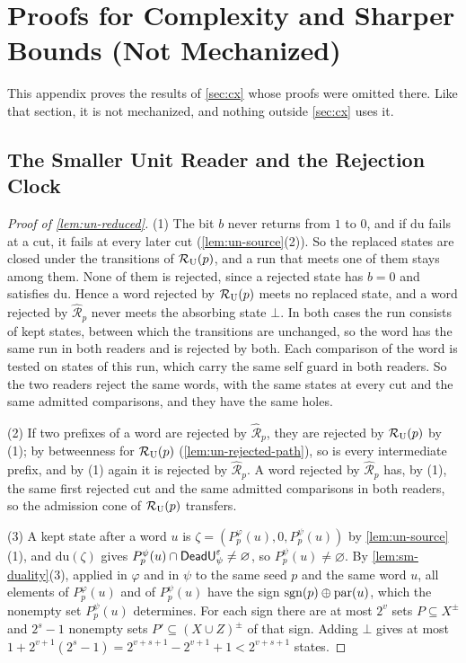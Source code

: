 
\section{Proofs for Complexity and Sharper Bounds (Not Mechanized)}\label{app:cx}

This appendix proves the results of \cref{sec:cx} whose proofs were omitted
there. Like that section, it is not mechanized, and nothing outside
\cref{sec:cx} uses it.

\subsection{The Smaller Unit Reader and the Rejection Clock}\label{app:cx-smaller}

\begin{proof}[Proof of \cref{lem:un-reduced}]
(1) The bit $b$ never returns from $1$ to $0$, and if $\mathrm{du}$ fails at a
cut, it fails at every later cut (\cref{lem:un-source}(2)). So the replaced
states are closed under the transitions of $\mathcal R_{\mathrm U}(p)$, and a run that meets one
of them stays among them. None of them is rejected, since a rejected state has
$b=0$ and satisfies $\mathrm{du}$. Hence a word rejected by $\mathcal R_{\mathrm U}(p)$ meets no
replaced state, and a word rejected by $\widehat{\mathcal R}_p$ never meets the
absorbing state $\bot$. In both cases the run consists of kept states, between
which the transitions are unchanged, so the word has the same run in both
readers and is rejected by both. Each comparison of the word is tested on
states of this run, which carry the same self guard in both readers. So the two
readers reject the same words, with the same states at every cut and the same
admitted comparisons, and they have the same holes.

(2) If two prefixes of a word are rejected by $\widehat{\mathcal R}_p$, they
are rejected by $\mathcal R_{\mathrm U}(p)$ by (1); by betweenness for $\mathcal R_{\mathrm U}(p)$
(\cref{lem:un-rejected-path}), so is every intermediate prefix, and by (1)
again it is rejected by $\widehat{\mathcal R}_p$. A word rejected by
$\widehat{\mathcal R}_p$ has, by (1), the same first rejected cut and the same
admitted comparisons in both readers, so the admission cone of $\mathcal R_{\mathrm U}(p)$
transfers.

(3) A kept state after a word $u$ is
$\zeta=(P^\varphi_p(u),0,P^\psi_p(u))$ by \cref{lem:un-source}(1), and
$\mathrm{du}(\zeta)$ gives $P^\psi_p(u)\cap\mathsf{DeadU}^\varepsilon_\psi\ne\varnothing$, so
$P^\psi_p(u)\ne\varnothing$. By \cref{lem:sm-duality}(3), applied in $\varphi$
and in $\psi$ to the same seed $p$ and the same word $u$, all elements of
$P^\varphi_p(u)$ and of $P^\psi_p(u)$ have the sign $\operatorname{sgn}(p)\oplus\operatorname{par}(u)$,
which the nonempty set $P^\psi_p(u)$ determines. For each sign there are at
most $2^v$ sets $P\subseteq X^\pm$ and $2^s-1$ nonempty sets
$P'\subseteq(X\cup Z)^\pm$ of that sign. Adding $\bot$ gives at most
$1+2^{v+1}(2^s-1)=2^{v+s+1}-2^{v+1}+1<2^{v+s+1}$ states.
\end{proof}

